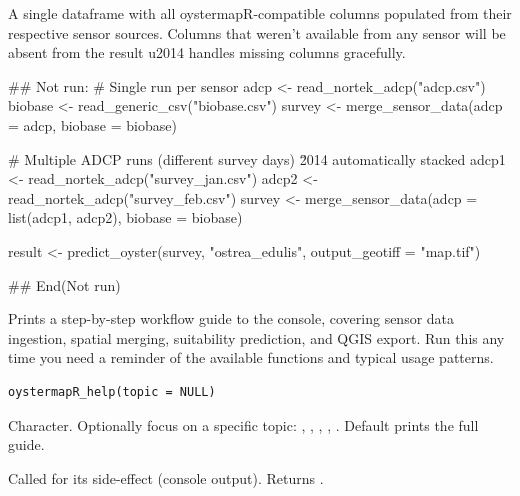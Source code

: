 \documentclass[a4paper]{book}
\begin{document}
%
\begin{Value}
A single dataframe with all oystermapR-compatible columns populated
from their respective sensor sources. Columns that weren't available from
any sensor will be absent from the result \bsl{}u2014  handles
missing columns gracefully.
\end{Value}
%
\begin{Examples}
\begin{ExampleCode}
## Not run: 
# Single run per sensor
adcp    <- read_nortek_adcp("adcp.csv")
biobase <- read_generic_csv("biobase.csv")
survey  <- merge_sensor_data(adcp = adcp, biobase = biobase)

# Multiple ADCP runs (different survey days) \u2014 automatically stacked
adcp1  <- read_nortek_adcp("survey_jan.csv")
adcp2  <- read_nortek_adcp("survey_feb.csv")
survey <- merge_sensor_data(adcp = list(adcp1, adcp2), biobase = biobase)

result <- predict_oyster(survey, "ostrea_edulis", output_geotiff = "map.tif")

## End(Not run)
\end{ExampleCode}
\end{Examples}
%
\begin{Description}
Prints a step-by-step workflow guide to the console, covering sensor data
ingestion, spatial merging, suitability prediction, and QGIS export.
Run this any time you need a reminder of the available functions and
typical usage patterns.
\end{Description}
%
\begin{Usage}
\begin{verbatim}
oystermapR_help(topic = NULL)
\end{verbatim}
\end{Usage}
%
\begin{Arguments}
\begin{ldescription}
\item[\code{topic}] Character. Optionally focus on a specific topic:
, , , , .
Default  prints the full guide.
\end{ldescription}
\end{Arguments}
%
\begin{Value}
Called for its side-effect (console output). Returns .
\end{Value}
\end{document}
